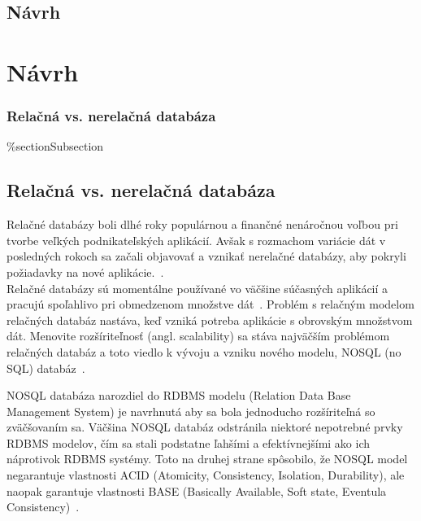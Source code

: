 \newpage
%
%
{
	\section{Návrh}
}
{
	\chapter{Návrh}
}
 
%
%
{
	\subsection{Relačná vs. nerelačná databáza}
}
{
	\%section{Subsection}
	\section{Relačná vs. nerelačná databáza}
}
\label{subsection:relation_vs_document_db}
Relačné databázy boli dlhé roky populárnou a finančné nenáročnou voľbou pri tvorbe veľkých podnikateľských aplikácií. Avšak s rozmachom variácie dát v posledných rokoch sa začali objavovať a vznikať nerelačné databázy, aby pokryli požiadavky na nové aplikácie.~\cite{MongoDBvsMySQLCompared}.
\\

Relačné databázy sú momentálne používané vo väčšine súčasných aplikácií a pracujú spoľahlivo pri obmedzenom množstve dát~\cite{MongoDBvsMySQL2015}. Problém s relačným modelom relačných databáz nastáva, keď vzniká potreba aplikácie s obrovským množstvom dát. Menovite rozšíriteľnosť (angl. scalability) sa stáva najväčším problémom relačných databáz a toto viedlo k vývoju a vzniku nového modelu, NOSQL (no SQL) databáz~\cite{NoSQLDBvsRealtionDB}.

NOSQL databáza narozdiel do RDBMS modelu (Relation Data Base Management System) je
navrhnutá aby sa bola jednoducho rozšíriteľná so zväčšovaním sa. Väčšina NOSQL databáz odstránila niektoré nepotrebné prvky RDBMS modelov, čím sa stali podstatne ľahšími a efektívnejšími ako ich náprotivok RDBMS systémy. Toto na druhej strane spôsobilo, že NOSQL model negarantuje vlastnosti ACID (Atomicity, Consistency, Isolation, Durability), ale naopak garantuje vlastnosti BASE (Basically Available, Soft state, Eventula Consistency)~\cite{NoSQLDBvsRealtionDB}.

